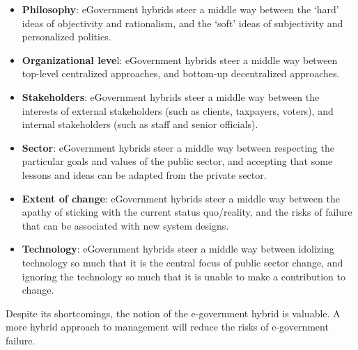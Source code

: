 \begin{itemize}
\item \textbf{Philosophy}: eGovernment hybrids steer a
middle way between the `hard’ ideas of
objectivity and rationalism, and the
`soft’ ideas of subjectivity and personalized politics.

\item  \textbf{Organizational leve}l:
eGovernment hybrids steer a middle way between
top-level centralized approaches, and
bottom-up decentralized approaches.

\item \textbf{Stakeholders}: eGovernment hybrids steer
a middle way between the interests of
external stakeholders (such as clients,
taxpayers, voters), and internal stakeholders (such as staff and senior officials).

\item \textbf{Sector}: eGovernment hybrids steer a
middle way between respecting the particular goals and values of the public
sector, and accepting that some lessons
and ideas can be adapted from the private
sector.

\item \textbf{Extent of change}: eGovernment hybrids
steer a middle way between the apathy
of sticking with the current status
quo/reality, and the risks of failure that
can be associated with new system
designs.

\item \textbf{Technology}: eGovernment hybrids steer a
middle way between idolizing technology so much that it is the central focus of
public sector change, and ignoring the
technology so much that it is unable to
make a contribution to change.
\end{itemize}

Despite its shortcomings, the notion of the
e-government hybrid is valuable. A more hybrid approach to management will reduce the risks of e-government
failure.


